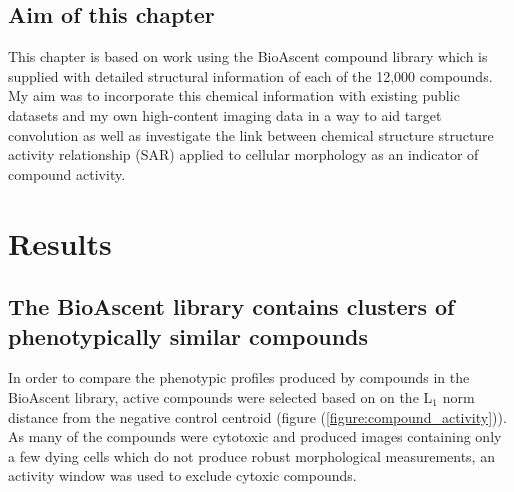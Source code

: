 \documentclass[a4paper,11pt,twoside,openright]{scrbook}
\begin{document}


\subsection{Aim of this chapter}
This chapter is based on work using the BioAscent compound library which is supplied with detailed structural information of each of the 12,000 compounds.
My aim was to incorporate this chemical information with existing public datasets and my own high-content imaging data in a way to aid target convolution as well as investigate the link between chemical structure structure activity relationship (SAR) applied to cellular morphology as an indicator of compound activity.








\section{Results}




\subsection{The BioAscent library contains clusters of phenotypically similar compounds}

In order to compare the phenotypic profiles produced by compounds in the BioAscent library, active compounds were selected based on on the L$_1$ norm distance from the negative control centroid (figure (\ref{figure:compound_activity})).
As many of the compounds were cytotoxic and produced images containing only a few dying cells which do not produce robust morphological measurements, an activity window was used to exclude cytoxic compounds.
\end{document}
